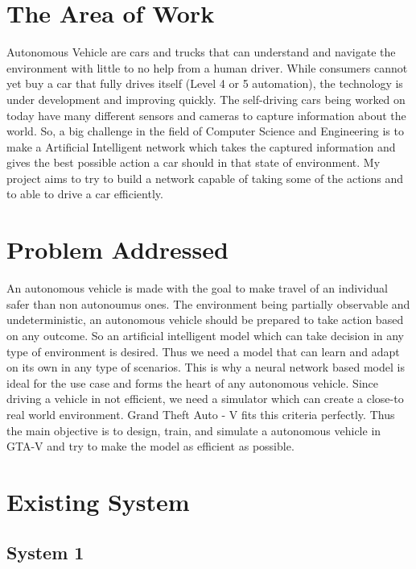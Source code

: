 \section{The Area of Work}
Autonomous Vehicle are cars and trucks that can understand and navigate the environment with little to no help from a human driver. While consumers cannot yet buy a car that fully drives itself (Level 4 or 5 automation)\cite{J3016_202104}, the technology is under development and improving quickly. The self-driving cars being worked on today have many different sensors and cameras to capture information about the world. So, a big challenge in the field of Computer Science and Engineering is to make a Artificial Intelligent network which takes the captured information and gives the best possible action a car should in that state of environment. My project aims to try to build a network capable of taking some of the actions and to able to drive a car efficiently.

\section{Problem Addressed}
An autonomous vehicle is made with the goal to make travel of an individual safer than non autonoumus ones. The environment being partially observable and undeterministic, an autonomous vehicle should be prepared to take action based on any outcome. So an artificial intelligent model which can take decision in any type of environment is desired. Thus we need a model that can learn and adapt on its own in any type of scenarios. This is why a neural network based model is ideal for the use case and forms the heart of any autonomous vehicle. Since driving a vehicle in not efficient, we need a simulator which can create a close-to real world environment. Grand Theft Auto - V fits this criteria perfectly. Thus the main objective is to design, train, and simulate a autonomous vehicle in GTA-V and try to make the model as efficient as possible.

\section{Existing System}
\blindtext

\subsection{System 1}
\blindtext 





